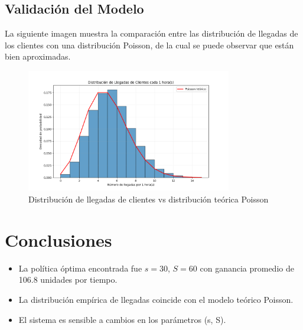 \documentclass{article}
\begin{document}
\subsection{Validación del Modelo}
La siguiente imagen muestra la comparación entre las distribución
de llegadas de los clientes con una distribución Poisson, de la cual se
puede observar que están bien aproximadas.
\begin{figure}[h]
    \centering
    \includegraphics[width=0.8\textwidth]{images/Distribucion de Llegadas de Clientes en n horas.png}
    \caption{Distribución de llegadas de clientes vs distribución teórica Poisson}
    \label{fig:arrivals}
\end{figure}

\newpage
\section{Conclusiones}

\begin{itemize}
    \item La política óptima encontrada fue $s=30$, $S=60$ con ganancia promedio de 106.8 unidades por tiempo.
    \item La distribución empírica de llegadas coincide con el modelo teórico Poisson.
    \item El sistema es sensible a cambios en los parámetros (s, S).
\end{itemize}
\end{document}
